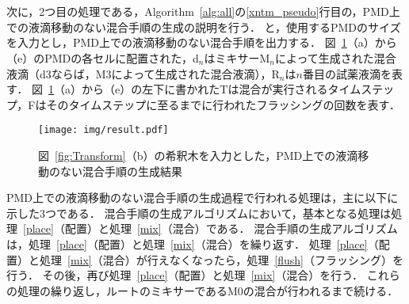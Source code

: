 \newpage 

\section{}
次に，2つ目の処理である，Algorithm~\ref{alg:all}の\ref{xntm_pseudo}行目の，PMD上での液滴移動のない混合手順の生成の説明を行う．
と，使用するPMDのサイズを入力とし，PMD上での液滴移動のない混合手順を出力する．
図~\ref{fig:result}（a）から（e）のPMDの各セルに配置された，d$_n$はミキサーM$_n$によって生成された混合液滴（d3ならば，M3によって生成された混合液滴），R$_n$は$n$番目の試薬液滴を表す．
図~\ref{fig:result}（a）から（e）の左下に書かれたTは混合が実行されるタイムステップ，Fはそのタイムステップに至るまでに行われたフラッシングの回数を表す．

\begin{figure}[tbp]
 \centering\texttt{[image: img/result.pdf]}
    \caption{図~\ref{fig:Transform}（b）の希釈木を入力とした，PMD上での液滴移動のない混合手順の生成結果}\label{fig:result}
\end{figure}



PMD上での液滴移動のない混合手順の生成過程で行われる処理は，主に以下に示した3つである．
混合手順の生成アルゴリズムにおいて，基本となる処理は処理~\ref{place}（配置）と処理~\ref{mix}（混合）である．
混合手順の生成アルゴリズムは，処理~\ref{place}（配置）と処理~\ref{mix}（混合）を繰り返す．
処理~\ref{place}（配置）と処理~\ref{mix}（混合）が行えなくなったら，処理~\ref{flush}（フラッシング）を行う．
その後，再び処理~\ref{place}（配置）と処理~\ref{mix}（混合）を行う．
これらの処理の繰り返し，ルートのミキサーであるM0の混合が行われるまで続ける．

